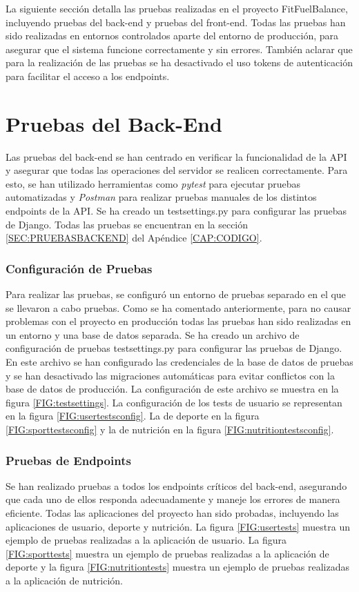 La siguiente sección detalla las pruebas realizadas en el proyecto FitFuelBalance, incluyendo pruebas del back-end y pruebas del front-end. Todas las pruebas han sido realizadas en entornos controlados aparte del entorno de producción, para asegurar que el sistema funcione correctamente y sin errores. También aclarar que para la realización de las pruebas se ha desactivado el uso tokens de autenticación para facilitar el acceso a los endpoints.
\section{Pruebas del Back-End}

Las pruebas del back-end se han centrado en verificar la funcionalidad de la API y asegurar que todas las operaciones del servidor se realicen correctamente. Para esto, se han utilizado herramientas como \textit{pytest} para ejecutar pruebas automatizadas y \textit{Postman} para realizar pruebas manuales de los distintos endpoints de la API. Se ha creado un testsettings.py para configurar las pruebas de Django. Todas las pruebas se encuentran en la sección \ref{SEC:PRUEBASBACKEND} del Apéndice \ref{CAP:CODIGO}.

\subsubsection{Configuración de Pruebas}
Para realizar las pruebas, se configuró un entorno de pruebas separado en el que se llevaron a cabo pruebas. Como se ha comentado anteriormente, para no causar problemas con el proyecto en producción todas las pruebas han sido realizadas en un entorno y una base de datos separada. Se ha creado un archivo de configuración de pruebas testsettings.py para configurar las pruebas de Django. En este archivo se han configurado las credenciales de la base de datos de pruebas y se han desactivado las migraciones automáticas para evitar conflictos con la base de datos de producción. La configuración de este archivo se muestra en la figura \ref{FIG:testsettings}.
La configuración de los tests de usuario se representan en la figura \ref{FIG:usertestsconfig}. La de deporte en la figura \ref{FIG:sporttestsconfig} y la de nutrición en la figura \ref{FIG:nutritiontestsconfig}.

\subsubsection{Pruebas de Endpoints}
Se han realizado pruebas a todos los endpoints críticos del back-end, asegurando que cada uno de ellos responda adecuadamente y maneje los errores de manera eficiente. Todas las aplicaciones del proyecto han sido probadas, incluyendo las aplicaciones de usuario, deporte y nutrición. La figura \ref{FIG:usertests} muestra un ejemplo de pruebas realizadas a la aplicación de usuario. La figura \ref{FIG:sporttests} muestra un ejemplo de pruebas realizadas a la aplicación de deporte y la figura \ref{FIG:nutritiontests} muestra un ejemplo de pruebas realizadas a la aplicación de nutrición.
